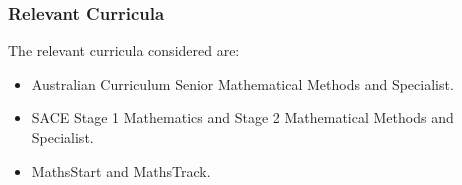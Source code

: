 \documentclass[14pt]{beamer}
\begin{document}
\begin{frame}
\frametitle{Relevant Curricula}
The relevant curricula considered are:
\begin{itemize}
	\item Australian Curriculum Senior Mathematical Methods and Specialist.
	\item SACE Stage 1 Mathematics and Stage 2 Mathematical Methods and Specialist.
	\item MathsStart and MathsTrack.
\end{itemize}
\end{frame}


%
%
\end{document}

